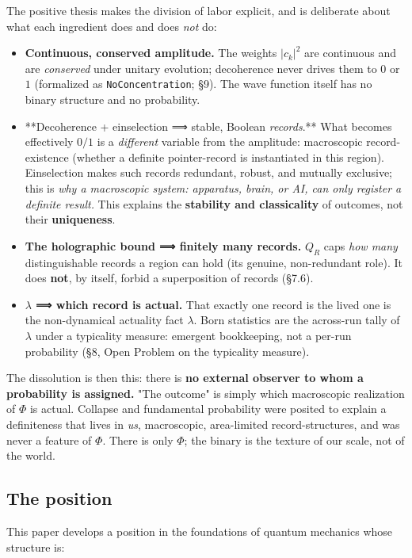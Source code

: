 \documentclass[11pt,a4paper]{article}
\begin{document}
The positive thesis makes the division of labor explicit, and is deliberate about what each ingredient does and does \emph{not} do:

\begin{itemize}
  \item \textbf{Continuous, conserved amplitude.} The weights $|c_k|^2$ are continuous and are \emph{conserved} under unitary evolution; decoherence never drives them to $0$ or $1$ (formalized as \texttt{NoConcentration}; §9). The wave function itself has no binary structure and no probability.
  \item **Decoherence + einselection ⟹ stable, Boolean \emph{records}.** What becomes effectively $0/1$ is a \emph{different} variable from the amplitude: macroscopic record-existence (whether a definite pointer-record is instantiated in this region). Einselection makes such records redundant, robust, and mutually exclusive; this is \emph{why a macroscopic system: apparatus, brain, or AI, can only register a definite result.} This explains the \textbf{stability and classicality} of outcomes, not their \textbf{uniqueness}.
  \item \textbf{The holographic bound ⟹ finitely many records.} $Q_R$ caps \emph{how many} distinguishable records a region can hold (its genuine, non-redundant role). It does \textbf{not}, by itself, forbid a superposition of records (§7.6).
  \item \textbf{$\lambda$ ⟹ which record is actual.} That exactly one record is the lived one is the non-dynamical actuality fact $\lambda$. Born statistics are the across-run tally of $\lambda$ under a typicality measure: emergent bookkeeping, not a per-run probability (§8, Open Problem on the typicality measure).
\end{itemize}

The dissolution is then this: there is \textbf{no external observer to whom a probability is assigned.} "The outcome" is simply which macroscopic realization of $\Phi$ is actual. Collapse and fundamental probability were posited to explain a definiteness that lives in \emph{us}, macroscopic, area-limited record-structures, and was never a feature of $\Phi$. There is only $\Phi$; the binary is the texture of our scale, not of the world.

\subsection{The position}

This paper develops a position in the foundations of quantum mechanics whose structure is:
\end{document}
